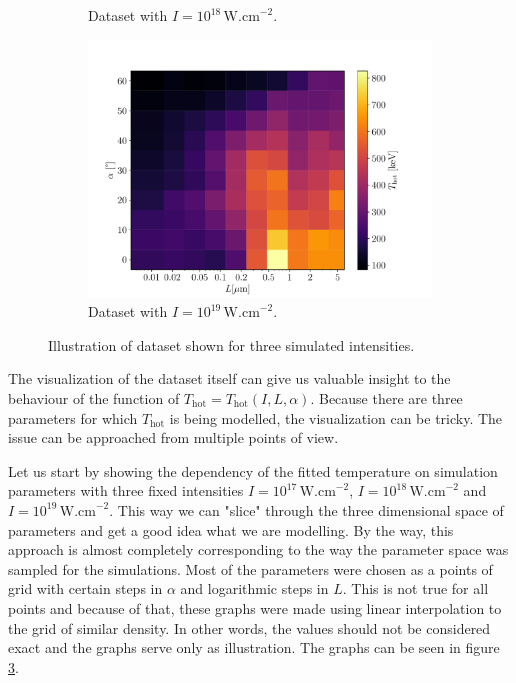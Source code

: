 \begin{figure}[ht]
\begin{subfigure}{0.49\textwidth}
		\caption{Dataset with $I =  10^{18} \, \mathrm{W.cm}^{-2}$.}
		\label{fig:datset1-b}
	\end{subfigure}
	\begin{subfigure}{0.49\textwidth}
		\centering
		\includegraphics[width=\textwidth]{figures/I_1e19t_hot}
		\caption{Dataset with $I = 10^{19} \, \mathrm{W.cm}^{-2}$.}
		\label{fig:dataset1-c}
	\end{subfigure}
	\caption{Illustration of dataset shown for three simulated intensities.}
	\label{fig:dataset1}
\end{figure}


The visualization of the dataset itself can give us valuable insight to the behaviour of the function of $T_{\mathrm{hot}} = T_{\mathrm{hot}}(I,L,\alpha)$. Because there are three parameters for which $T_{\mathrm{hot}}$ is being modelled, the visualization can be tricky. The issue can be approached from multiple points of view.

Let us start by showing the dependency of the fitted temperature on simulation parameters with three fixed intensities $I = 10^{17} \,\mathrm{W.cm}^{-2}$, $I = 10^{18} \,\mathrm{W.cm}^{-2}$ and $I = 10^{19} \,\mathrm{W.cm}^{-2}$. This way we can "slice" through the three dimensional space of parameters and get a good idea what we are modelling. By the way, this approach is almost completely corresponding to the way the parameter space was sampled for the simulations. Most of the parameters were chosen as a points of grid with certain steps in $\alpha$ and logarithmic steps in $L$. This is not true for all points and because of that, these graphs were made using linear interpolation to the grid of similar density. In other words, the values should not be considered exact and the graphs serve only as illustration. The graphs can be seen in figure \ref{fig:dataset1}.


